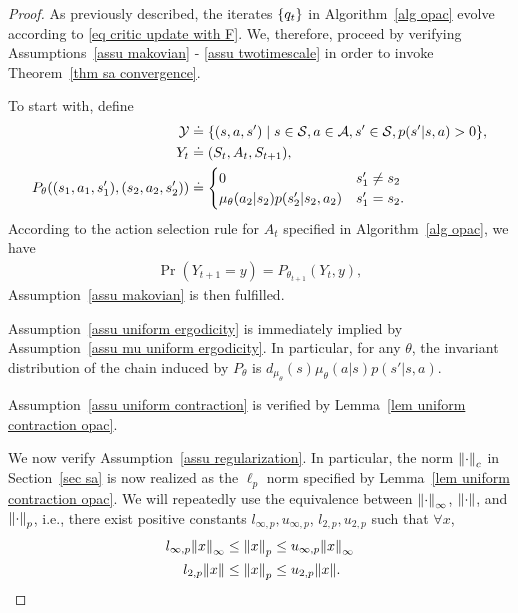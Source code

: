 \documentclass[twoside,11pt]{article}
\newcommand{\fS}{\mathcal{S}}
\newcommand{\fA}{\mathcal{A}}
\newcommand{\fY}{\mathcal{Y}}
\numberwithin{assucounter}{section}
\begin{document}
\propcriticconvergence*
\label{sec proof prop critic convergence}
\begin{proof}
  As previously described, 
  the iterates $\qty{q_t}$ in Algorithm~\ref{alg opac} evolve according to \eqref{eq critic update with F}.
  We, therefore, proceed by verifying Assumptions~\ref{assu makovian} - \ref{assu twotimescale} in order to invoke Theorem~\ref{thm sa convergence}.

  To start with,
  define
  \begin{align}
    \label{eq definition of y}
    \fY &\doteq \qty{(s, a, s') \mid s \in \fS, a \in \fA, s' \in \fS, p(s'|s, a) > 0}, \\
    Y_t &\doteq (S_t, A_t, S_{t+1}), \\
    P_{\theta}((s_1, a_1, s_1'), (s_2, a_2, s_2')) &\doteq \begin{cases}
      0 & s_1' \neq s_2 \\
      \mu_\theta(a_2|s_2) p(s_2'|s_2, a_2) & s_1' = s_2.
    \end{cases}
  \end{align} 
  According to the action selection rule for $A_{t}$ specified in Algorithm~\ref{alg opac},
  we have
  \begin{align}
    \Pr(Y_{t+1} = y) = P_{\theta_{t+1}}(Y_t, y),
  \end{align}
  Assumption~\ref{assu makovian} is then fulfilled.

  Assumption~\ref{assu uniform ergodicity} is immediately implied by Assumption~\ref{assu mu uniform ergodicity}.
  In particular, 
  for any $\theta$,
  the invariant distribution of 
  the chain induced by $P_\theta$ is $d_{\mu_\theta}(s)\mu_\theta(a|s)p(s'|s, a)$.

  Assumption~\ref{assu uniform contraction} is verified by Lemma~\ref{lem uniform contraction opac}.

  We now verify Assumption~\ref{assu regularization}.
  In particular,
  the norm $\norm{\cdot}_c$ in Section~\ref{sec sa} is now realized as the $\ell_p$ norm specified by Lemma~\ref{lem uniform contraction opac}.
  We will repeatedly use the equivalence between 
  $\norm{\cdot}_\infty$, $\norm{\cdot}$, and $\norm{\cdot}_p$,
  i.e.,
  there exist positive constants $l_{\infty, p}, u_{\infty, p}$, $l_{2, p}, u_{2, p}$ such that $\forall x$,
  \begin{align}
    l_{\infty, p} \norm{x}_\infty &\leq \norm{x}_p \leq u_{\infty, p} \norm{x}_\infty \\
    l_{2, p} \norm{x} &\leq \norm{x}_p \leq u_{2, p} \norm{x}.
  \end{align}


\end{proof}
\end{document}
